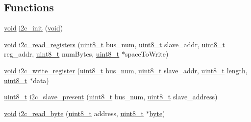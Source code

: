 \subsection*{Functions}
\begin{DoxyCompactItemize}
\item 
\hyperlink{usb__devapi_8h_afabf60e7f57651d6d595a02c75f07cd0}{void} \hyperlink{group___i2_c_ga5730d9445429351b9f750084c5cb5aae}{i2c\+\_\+init} (\hyperlink{usb__devapi_8h_afabf60e7f57651d6d595a02c75f07cd0}{void})
\item 
\hyperlink{usb__devapi_8h_afabf60e7f57651d6d595a02c75f07cd0}{void} \hyperlink{group___i2_c_ga460462394097795883ce49312648f8a6}{i2c\+\_\+read\+\_\+registers} (\hyperlink{_p_e___types_8h_aba7bc1797add20fe3efdf37ced1182c5}{uint8\+\_\+t} bus\+\_\+num, \hyperlink{_p_e___types_8h_aba7bc1797add20fe3efdf37ced1182c5}{uint8\+\_\+t} slave\+\_\+addr, \hyperlink{_p_e___types_8h_aba7bc1797add20fe3efdf37ced1182c5}{uint8\+\_\+t} reg\+\_\+addr, \hyperlink{_p_e___types_8h_aba7bc1797add20fe3efdf37ced1182c5}{uint8\+\_\+t} num\+Bytes, \hyperlink{_p_e___types_8h_aba7bc1797add20fe3efdf37ced1182c5}{uint8\+\_\+t} $\ast$space\+To\+Write)
\item 
\hyperlink{usb__devapi_8h_afabf60e7f57651d6d595a02c75f07cd0}{void} \hyperlink{group___i2_c_ga3d674f0d94dcf5c755869bc6762dafef}{i2c\+\_\+write\+\_\+register} (\hyperlink{_p_e___types_8h_aba7bc1797add20fe3efdf37ced1182c5}{uint8\+\_\+t} bus\+\_\+num, \hyperlink{_p_e___types_8h_aba7bc1797add20fe3efdf37ced1182c5}{uint8\+\_\+t} slave\+\_\+addr, \hyperlink{_p_e___types_8h_aba7bc1797add20fe3efdf37ced1182c5}{uint8\+\_\+t} length, \hyperlink{_p_e___types_8h_aba7bc1797add20fe3efdf37ced1182c5}{uint8\+\_\+t} $\ast$data)
\item 
\hyperlink{_p_e___types_8h_aba7bc1797add20fe3efdf37ced1182c5}{uint8\+\_\+t} \hyperlink{group___i2_c_ga8f793e884b17bebb70615748dbf6434a}{i2c\+\_\+slave\+\_\+present} (\hyperlink{_p_e___types_8h_aba7bc1797add20fe3efdf37ced1182c5}{uint8\+\_\+t} bus\+\_\+num, \hyperlink{_p_e___types_8h_aba7bc1797add20fe3efdf37ced1182c5}{uint8\+\_\+t} slave\+\_\+address)
\item 
\hyperlink{usb__devapi_8h_afabf60e7f57651d6d595a02c75f07cd0}{void} \hyperlink{group___i2_c_ga846c148c6c939378ab9db213af23b1ea}{i2c\+\_\+read\+\_\+byte} (\hyperlink{_p_e___types_8h_aba7bc1797add20fe3efdf37ced1182c5}{uint8\+\_\+t} address, \hyperlink{_p_e___types_8h_aba7bc1797add20fe3efdf37ced1182c5}{uint8\+\_\+t} $\ast$\hyperlink{_p_e___types_8h_a0c8186d9b9b7880309c27230bbb5e69d}{byte})
\item 

\end{DoxyCompactItemize}
